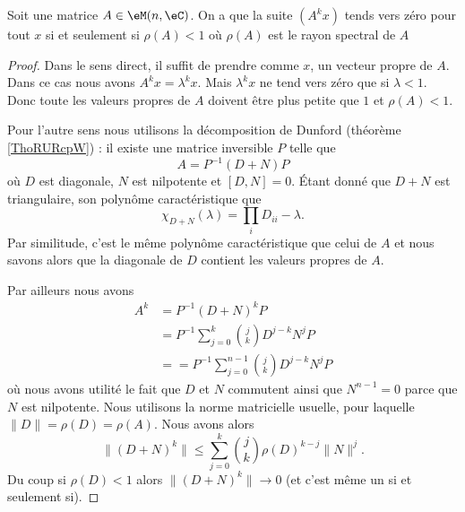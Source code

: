 \begin{theorem}
    Soit une matrice \( A\in \eM(n,\eC)\). On a que la suite \( (A^kx)\) tends vers zéro pour tout \( x\) si et seulement si \( \rho(A)<1\) où \( \rho(A)\) est le rayon spectral de $A$
\end{theorem}

\begin{proof}
    Dans le sens direct, il suffit de prendre comme \( x\), un vecteur propre de \( A\). Dans ce cas nous avons \( A^kx=\lambda^kx\). Mais \( \lambda^kx\) ne tend vers zéro que si \( \lambda<1\). Donc toute les valeurs propres de \( A\) doivent être plus petite que \( 1\) et \( \rho(A)<1\).

    Pour l'autre sens nous utilisons la décomposition de Dunford (théorème \ref{ThoRURcpW}) : il existe une matrice inversible \( P\) telle que
    \begin{equation}
        A=P^{-1}(D+N)P
    \end{equation}
    où \( D\) est diagonale, \( N\) est nilpotente et \( [D,N]=0\). Étant donné que \( D+N\) est triangulaire, son polynôme caractéristique que
    \begin{equation}
        \chi_{D+N}(\lambda)=\prod_i D_{ii}-\lambda.
    \end{equation}
    Par similitude, c'est le même polynôme caractéristique que celui de \( A\) et nous savons alors que la diagonale de \( D\) contient les valeurs propres de \( A\).

    Par ailleurs nous avons
    \begin{subequations}
        \begin{align}
            A^k&=P^{-1}(D+N)^kP\\
            &=P^{-1}\sum_{j=0}^k{j\choose k}D^{j-k}N^jP\\
            &==P^{-1}\sum_{j=0}^{n-1}{j\choose k}D^{j-k}N^jP
        \end{align}
    \end{subequations}
    où nous avons utilité le fait que \( D\) et \( N\) commutent ainsi que \( N^{n-1}=0\) parce que \( N\) est nilpotente. Nous utilisons la norme matricielle usuelle, pour laquelle \( \| D \|=\rho(D)=\rho(A)\). Nous avons alors
    \begin{equation}
        \| (D+N)^k \|\leq \sum_{j=0}^k{j\choose k}\rho(D)^{k-j}\| N \|^j.
    \end{equation}
    Du coup si \( \rho(D)<1\) alors \( \| (D+N)^k \|\to 0\) (et c'est même un si et seulement si).
\end{proof}


